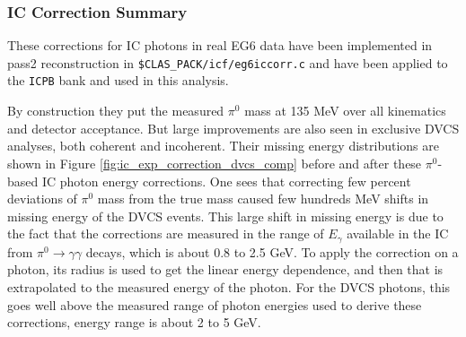 \subsubsection{IC Correction Summary}
These corrections for IC photons in real EG6 data have been implemented in pass2 reconstruction in \texttt{\$CLAS\_PACK/icf/eg6iccorr.c} and have been applied to the \texttt{ICPB} bank and used in this analysis.

By construction they put the measured $\pi^0$ mass at 135 MeV over all 
kinematics and detector acceptance.  But large improvements are also seen in 
exclusive DVCS analyses, both coherent and incoherent. Their missing energy 
distributions are shown in Figure \ref{fig:ic_exp_correction_dvcs_comp} before 
and after these $\pi^0$-based IC photon energy corrections. One sees that 
correcting few percent deviations of $\pi^{0}$ mass from the true mass caused 
few hundreds MeV shifts in missing energy of the DVCS events. This large shift 
in missing energy is due to the fact that the corrections are measured in the 
range of $E_\gamma$ available in the IC from $\pi^0\to\gamma\gamma$ decays, 
which is about 0.8 to 2.5 GeV. To apply the correction on a photon, its radius 
is used to get the linear energy dependence, and then that is extrapolated to 
the measured energy of the photon.  For the DVCS photons, this goes well above 
the measured range of photon energies used to derive these corrections, energy 
range is about 2 to 5 GeV.  


